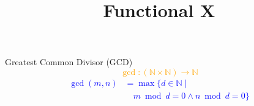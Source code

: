 \documentclass[12pt,t]{beamer}
\title{Functional X}
\begin{document}
{
}

\begin{frame}{Greatest Common Divisor (GCD)}
    \centering
    \Large %
    \textcolor{orange}{\[
        \gcd : (\mathbb{N} \times \mathbb{N}) \to \mathbb{N}
    \]}
        \vspace{0.5cm} %
    \textcolor{blue}{
        \begin{align*}
            \gcd(m,n) &= \max \big\{ d \in \mathbb{N} \mid \\
            &\quad m \bmod d = 0 \wedge n \bmod d = 0 \big\}
        \end{align*}
    }
\end{frame}
\end{document}
